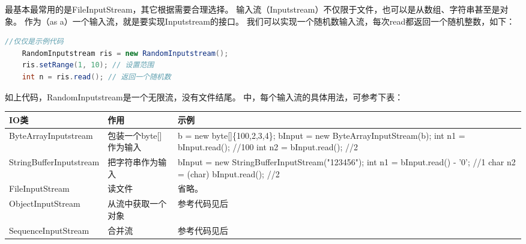 \noindent
最基本最常用的是FileInputStream，其它根据需要合理选择。
输入流（Inputstream）不仅限于文件，也可以是从数组、字符串甚至是对象。
作为（as a）一个输入流，就是要实现Inputstream的接口。
我们可以实现一个随机数输入流，每次read都返回一个随机整数，如下：
\vspace{0.3cm}
\begin{lstlisting}[language=Java]
	//仅仅是示例代码
	RandomInputstream ris = new RandomInputstream();
	ris.setRange(1, 10); // 设置范围
	int n = ris.read(); // 返回一个随机数
\end{lstlisting}
\noindent
如上代码，RandomInputstream是一个无限流，没有文件结尾。
中，每个输入流的具体用法，可参考下表：
\vspace{0.3cm}
\begin{table}[!htbp]\centering
	\begin{tabular}{|p{4cm}|p{3cm}|p{5cm}|}
	\hline
	IO类&作用&示例\\ 
	\hline
	ByteArrayInputstream&
	包装一个byte[]作为输入&
	b = new byte[]\{100,2,3,4\}; \newline
	bInput = new ByteArrayInputStream(b);\newline
	int n1 = bInput.read(); //100 \newline
	int n2 = bInput.read(); //2 \newline \\
	\hline
	StringBufferInputstream&
	把字符串作为输入&
	bInput = new StringBufferInputStream("123456");\newline
	int n1 = bInput.read() - '0'; //1\newline
	char n2 = (char) bInput.read(); //2\\
	\hline
	FileInputStream&读文件&省略。\\
	\hline
	ObjectInputStream&从流中获取一个对象&参考代码见后\\
	\hline
	SequenceInputStream&合并流&参考代码见后\\
	\hline
	\end{tabular}
\end{table}

